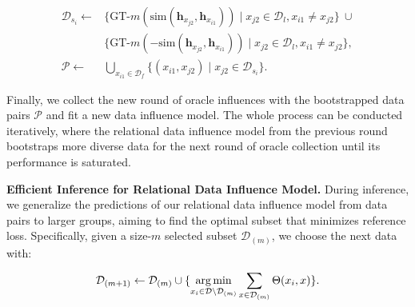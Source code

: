 \begin{small}
\begin{align}
    \mathcal{D}_{s_i} \leftarrow &\{\text{GT-}m(\text{sim}(\textbf{h}_{x_{j2}},\textbf{h}_{x_{i1}})) \mid x_{j2} \in \mathcal{D}_l, x_{i1} \neq x_{j2}\}~\cup \nonumber \\
    &\{\text{GT-}m(-\text{sim}(\textbf{h}_{x_{j2}},\textbf{h}_{x_{i1}})) \mid x_{j2} \in \mathcal{D}_l, x_{i1} \neq x_{j2}\}, \nonumber \\
    \mathcal{P} \leftarrow & \bigcup_{x_{i1} \in \mathcal{D}_f}\{(x_{i1}, x_{j2}) \mid x_{j2} \in \mathcal{D}_{s_i}\}.
\end{align}
\end{small}

Finally, we collect the new round of oracle influences with the bootstrapped data pairs $\mathcal{P}$ and fit a new data influence model. The whole process can be conducted iteratively, where the relational data influence model from the previous round bootstraps more diverse data for the next round of oracle collection until its performance is saturated.





\textbf{Efficient Inference for Relational Data Influence Model.}
During inference, we generalize the predictions of our relational data influence model from data pairs to larger groups, aiming to find the optimal subset that minimizes reference loss.
Specifically, given a size-$m$ selected subset $\mathcal{D}_{(m)}$, we choose the next data with:

\begin{equation}
     \mathcal{D}_{(m+1)} \leftarrow \mathcal{D}_{(m)} \cup \{\operatorname*{arg\,min}\limits_{x_i \in \mathcal{D}\setminus\mathcal{D}_{(m)}} \sum_{x \in \mathcal{D}_{(m)}} \Theta(x_i, x)\}. \label{eq:infer}
\end{equation}

